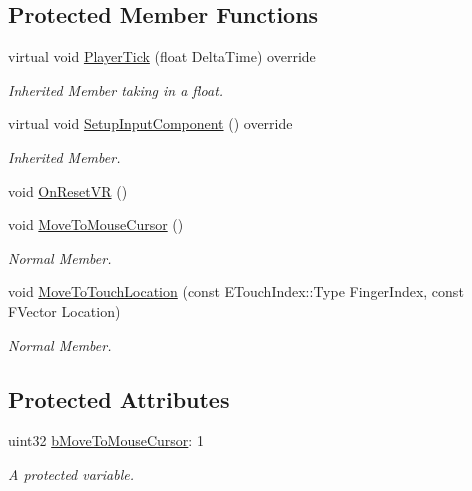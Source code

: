 \subsection*{Protected Member Functions}
\begin{DoxyCompactItemize}
\item 
virtual void \hyperlink{class_a_x_a3_player_controller_a4517394eaa773561191813ea4c2959b6}{Player\+Tick} (float Delta\+Time) override
\begin{DoxyCompactList}\small\item\em Inherited Member taking in a float. \end{DoxyCompactList}\item 
virtual void \hyperlink{class_a_x_a3_player_controller_ae1a9e48d7cb021a81ea0357b3be6afa6}{Setup\+Input\+Component} () override
\begin{DoxyCompactList}\small\item\em Inherited Member. \end{DoxyCompactList}\item 
void \hyperlink{class_a_x_a3_player_controller_a799e0ef8edbdb796c7b5286a7e53bac6}{On\+Reset\+VR} ()
\item 
void \hyperlink{class_a_x_a3_player_controller_a14779b01d600fdb7b9f4440e06e8288d}{Move\+To\+Mouse\+Cursor} ()
\begin{DoxyCompactList}\small\item\em Normal Member. \end{DoxyCompactList}\item 
void \hyperlink{class_a_x_a3_player_controller_a491c620eeaa2db69f8fb4e5a2b1c5cb3}{Move\+To\+Touch\+Location} (const E\+Touch\+Index\+::\+Type Finger\+Index, const F\+Vector Location)
\begin{DoxyCompactList}\small\item\em Normal Member. \end{DoxyCompactList}\end{DoxyCompactItemize}
\subsection*{Protected Attributes}
\begin{DoxyCompactItemize}
\item 
uint32 \hyperlink{class_a_x_a3_player_controller_af4d6c8b0909b0bc00e5b1df2437353bb}{b\+Move\+To\+Mouse\+Cursor}\+: 1
\begin{DoxyCompactList}\small\item\em A protected variable. \end{DoxyCompactList}\end{DoxyCompactItemize}


